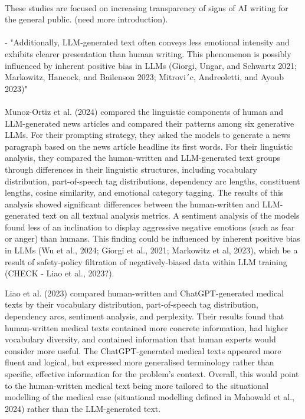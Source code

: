 \documentclass[thesis]{cluu}
\begin{document}
\paragraph{}
These studies are focused on increasing transparency of signs of AI writing for the general public. (need more introduction). 
\paragraph{}
- "Additionally, LLM-generated text often conveys less emotional intensity and exhibits clearer presentation than human writing.  This phenomenon is possibly influenced by inherent positive bias in LLMs (Giorgi, Ungar, and Schwartz 2021; Markowitz, Hancock, and Bailenson 2023; Mitrovi´c, Andreoletti, and Ayoub 2023)"
\paragraph{}
Munoz-Ortiz et al. (2024) compared the linguistic components of
human and LLM-generated news articles and compared their
patterns among six generative LLMs. For their prompting
strategy, they asked the models to generate a news paragraph
based on the news article headline its first words. For their
linguistic analysis, they compared the human-written and
LLM-generated text groups through differences in their
linguistic structures, including vocabulary distribution,
part-of-speech tag distributions, dependency arc lengths,
constituent lengths, cosine similarity, and emotional category
tagging. The results of this analysis showed significant
differences between the human-written and LLM-generated text on
all textual analysis metrics. A sentiment analysis of the models found less of an inclination to display aggressive negative emotions (such as fear or anger) than humans. This finding could be influenced by inherent positive bias in LLMs (Wu et al., 2024; Giorgi et al., 2021; Markowitz et al, 2023), which be a result of safety-policy filtration of negatively-biased data within LLM training (CHECK - Liao et al., 2023?). 

Liao et al. (2023) compared
human-written and ChatGPT-generated medical texts by their vocabulary
distribution, part-of-speech tag distribution, dependency arcs,
sentiment analysis, and perplexity. Their results found that human-written
medical texts contained more concrete information, had higher
vocabulary diversity, and contained information that human
experts would consider more useful. The ChatGPT-generated
medical texts appeared more fluent and logical, but expressed
more generalised terminology rather than specific, effective
information for the problem's context. Overall, this would point
to the human-written medical text being more tailored to the
situational modelling of the medical case (situational modelling
defined in Mahowald et al., 2024) rather than the LLM-generated
text.
\end{document}
